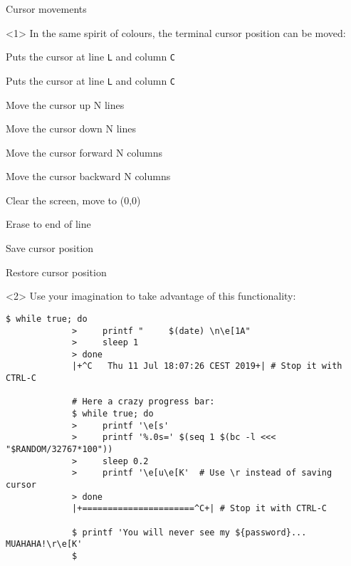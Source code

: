 \begin{frame}[fragile]{Cursor movements}
    \vspace{-1mm}
    \begin{onlyenv}<1>
        In the same spirit of colours, the terminal cursor position can be moved:
        \smallskip
        \begin{description}
            {\item[\texttt{<Esc>[<L>;<C>H}] Puts the cursor at line \texttt{L} and column \texttt{C}
            \item[\texttt{<Esc>[<L>;<C>f}] Puts the cursor at line \texttt{L} and column \texttt{C}
            \item[\texttt{<Esc>[<N>A}] Move the cursor up N lines
            \item[\texttt{<Esc>[<N>B}] Move the cursor down N lines
            \item[\texttt{<Esc>[<N>C}] Move the cursor forward N columns
            \item[\texttt{<Esc>[<N>D}] Move the cursor backward N columns
            \item[\texttt{<Esc>[2J}] Clear the screen, move to (0,0)
            \item[\texttt{<Esc>[K}] Erase to end of line
            \item[\texttt{<Esc>[s}] Save cursor position
            \item[\texttt{<Esc>[u}] Restore cursor position}
        \end{description}
    \end{onlyenv}
    \begin{onlyenv}<2>
        Use your imagination to take advantage of this functionality:
        \medskip
        \begin{lstlisting}[style=MyBash, numbers=none, xleftmargin=3mm, xrightmargin=3mm]
             $ while true; do
             >     printf "     $(date) \n\e[1A"
             >     sleep 1
             > done
             |+^C   Thu 11 Jul 18:07:26 CEST 2019+| # Stop it with CTRL-C

             # Here a crazy progress bar:
             $ while true; do
             >     printf '\e[s'
             >     printf '%.0s=' $(seq 1 $(bc -l <<< "$RANDOM/32767*100"))
             >     sleep 0.2
             >     printf '\e[u\e[K'  # Use \r instead of saving cursor
             > done
             |+======================^C+| # Stop it with CTRL-C

             $ printf 'You will never see my ${password}... MUAHAHA!\r\e[K'
             $
        \end{lstlisting}
    \end{onlyenv}
    \PrepareURLsymbol[PB]
\end{frame}

